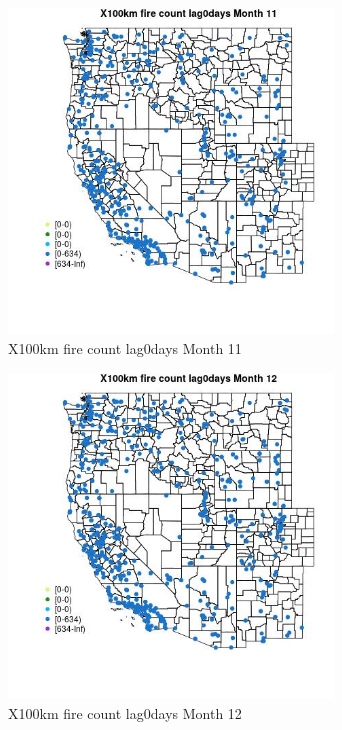 \begin{figure} 
\centering  
\includegraphics[width=0.77\textwidth]{Code_Outputs/Report_ML_input_PM25_Step4_part_e_de_duplicated_aves_compiled_2019-05-14wNAs_MapObsMo11X100km_fire_count_lag0days.jpg} 
\caption{\label{fig:Report_ML_input_PM25_Step4_part_e_de_duplicated_aves_compiled_2019-05-14wNAsMapObsMo11X100km_fire_count_lag0days}X100km fire count lag0days Month 11} 
\end{figure} 
 

\clearpage 

\begin{figure} 
\centering  
\includegraphics[width=0.77\textwidth]{Code_Outputs/Report_ML_input_PM25_Step4_part_e_de_duplicated_aves_compiled_2019-05-14wNAs_MapObsMo12X100km_fire_count_lag0days.jpg} 
\caption{\label{fig:Report_ML_input_PM25_Step4_part_e_de_duplicated_aves_compiled_2019-05-14wNAsMapObsMo12X100km_fire_count_lag0days}X100km fire count lag0days Month 12} 
\end{figure} 
 

